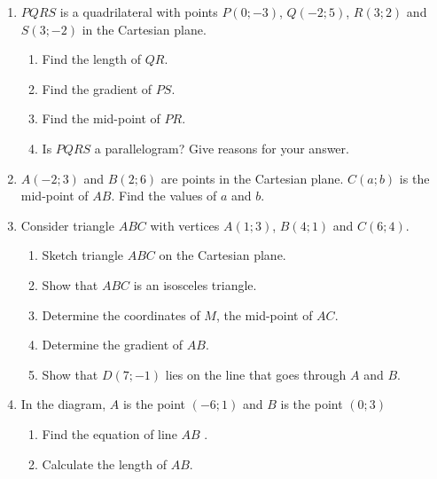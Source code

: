 \begin{eocexercises}{}
\begin{enumerate}[noitemsep, label=\textbf{\arabic*}. ]
  \item  $PQRS$ is a quadrilateral with points $P(0;-3)$, $Q(-2;5)$, $R(3;2)$ and $S(3;-2)$  in the Cartesian plane.
    \begin{enumerate}[noitemsep, label=\textbf{(\alph*)} ]
    \item Find the length of $QR$.
    \item Find the gradient of $PS$.
    \item Find the mid-point of $PR$.
    \item Is $PQRS$ a parallelogram?  Give reasons for your answer.
    \end{enumerate}
  \item $A(-2;3)$ and $B(2;6)$ are points in the Cartesian plane. $C(a;b)$ is the mid-point of $AB$. Find the values of $a$ and $b$.
  \item Consider triangle $ABC$ with vertices $A(1; 3)$, $B(4;1)$ and $C(6; 4)$.
    \begin{enumerate}[noitemsep, label=\textbf{(\alph*)} ]
    \item Sketch triangle $ABC$ on the Cartesian plane. 
    \item Show that $ABC$ is an isosceles triangle.
    \item Determine the coordinates of $M$, the mid-point of $AC$.
    \item Determine the gradient of $AB$.
    \item Show that $D(7;-1)$ lies on the line that goes through $A$ and $B$.
    \end{enumerate}
  \item In the diagram, $A$ is the point $(-6;1)$ and $B$ is the point $(0;3)$
    \setcounter{subfigure}{0}
    \begin{figure}[H] %
      \begin{center}
      \end{center}
    \end{figure} 
    \begin{enumerate}[noitemsep, label=\textbf{(\alph*)} ]
    \item Find the equation of line $AB$ .
    \item Calculate the length of $AB$.
    \end{enumerate}


\end{enumerate}
\end{eocexercises}
